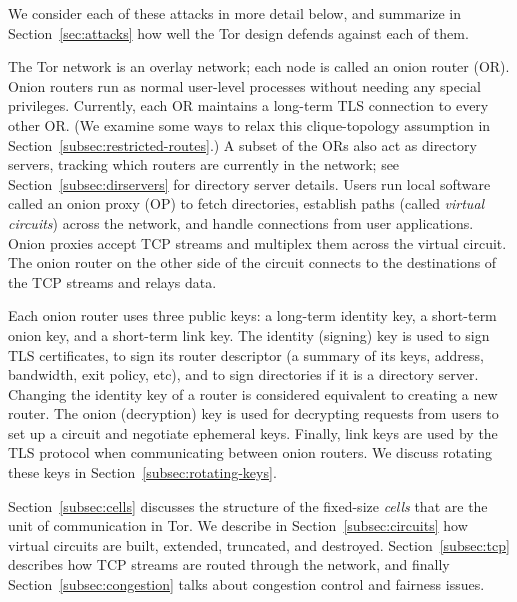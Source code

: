 \documentclass[times,10pt,twocolumn]{article}
\begin{document}
We consider each of these attacks in more detail below, and summarize
in Section~\ref{sec:attacks} how well the Tor design defends against
each of them.


\label{sec:design}

The Tor network is an overlay network; each node is called an onion router
(OR). Onion routers run as normal user-level processes without needing
any special
privileges.  Currently, each OR maintains a long-term TLS \cite{TLS}
connection to every other
OR.  (We examine some ways to relax this clique-topology assumption in
Section~\ref{subsec:restricted-routes}.) A subset of the ORs also act as
directory servers, tracking which routers are currently in the network;
see Section~\ref{subsec:dirservers} for directory server details. Users
run local software called an onion proxy (OP) to fetch directories,
establish paths (called \emph{virtual circuits}) across the network,
and handle connections from user applications. Onion proxies accept
TCP streams and multiplex them across the virtual circuit. The onion
router on the other side 
of the circuit connects to the destinations of
the TCP streams and relays data.

Each onion router uses three public keys: a long-term identity key, a
short-term onion key, and a short-term link key.  The identity
(signing) key is used to sign TLS certificates, to sign its router
descriptor (a summary of its keys, address, bandwidth, exit policy,
etc), and to sign directories if it is a directory server. Changing
the identity key of a router is considered equivalent to creating a
new router. The onion (decryption) key is used for decrypting requests
from users to set up a circuit and negotiate ephemeral keys. Finally,
link keys are used by the TLS protocol when communicating between
onion routers.  We discuss rotating these keys in
Section~\ref{subsec:rotating-keys}.

Section~\ref{subsec:cells} discusses the structure of the fixed-size
\emph{cells} that are the unit of communication in Tor. We describe
in Section~\ref{subsec:circuits} how virtual circuits are
built, extended, truncated, and destroyed. Section~\ref{subsec:tcp}
describes how TCP streams are routed through the network, and finally
Section~\ref{subsec:congestion} talks about congestion control and
fairness issues.
\end{document}
